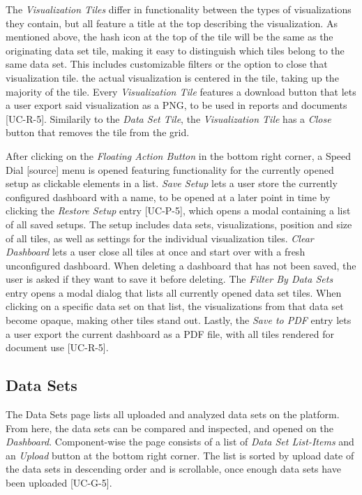 The \emph{Visualization Tiles} differ in functionality between the types of visualizations they contain, but all feature a title at the top describing the visualization. As mentioned above, the hash icon at the top of the tile will be the same as the originating data set tile, making it easy to distinguish which tiles belong to the same data set. This includes customizable filters or the option to close that visualization tile. the actual visualization is centered in the tile, taking up the majority of the tile. Every \emph{Visualization Tile} features a download button that lets a user export said visualization as a PNG, to be used in reports and documents [UC-R-5]. Similarily to the \emph{Data Set Tile}, the \emph{Visualization Tile} has a \emph{Close} button that removes the tile from the grid.

After clicking on the \emph{Floating Action Button} in the bottom right corner, a Speed Dial [source] menu is opened featuring functionality for the currently opened setup as clickable elements in a list.
\emph{Save Setup} lets a user store the currently configured dashboard with a name, to be opened at a later point in time by clicking the \emph{Restore Setup} entry [UC-P-5], which opens a modal containing a list of all saved setups. The setup includes data sets, visualizations, position and size of all tiles, as well as settings for the individual visualization tiles. \emph{Clear Dashboard} lets a user close all tiles at once and start over with a fresh unconfigured dashboard. When deleting a dashboard that has not been saved, the user is asked if they want to save it before deleting. The \emph{Filter By Data Sets} entry opens a modal dialog that lists all currently opened data set tiles. When clicking on a specific data set on that list, the visualizations from that data set become opaque, making other tiles stand out. Lastly, the \emph{Save to PDF} entry lets a user export the current dashboard as a PDF file, with all tiles rendered for document use [UC-R-5].

\subsection{Data Sets}
The Data Sets page lists all uploaded and analyzed data sets on the platform. From here, the data sets can be compared and inspected, and opened on the \emph{Dashboard}. Component-wise the page consists of a list of \emph{Data Set List-Items} and an \emph{Upload} button at the bottom right corner. The list is sorted by upload date of the data sets in descending order and is scrollable, once enough data sets have been uploaded [UC-G-5].

